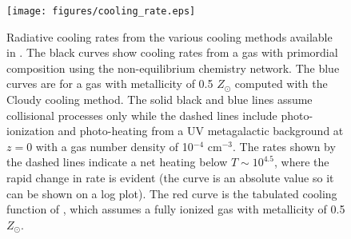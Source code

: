 \begin{figure}
  \begin{center}
    \texttt{[image: figures/cooling\_rate.eps]}
  \end{center}
  \caption{Radiative cooling rates from the various cooling methods
    available in \enzo.  The black curves show cooling rates from a gas
    with primordial composition using the non-equilibrium chemistry
    network.  The blue curves are for a gas with metallicity of 0.5
    $Z_{\odot}$ computed with the Cloudy cooling method.  The solid
    black and blue lines assume collisional processes only while the
    dashed lines include photo-ionization and photo-heating from a UV
    metagalactic background at $z = 0$ with a gas number density of
    10$^{-4}$ cm$^{-3}$.  The rates shown by the
    dashed lines indicate a net heating below $T \sim 10^{4.5}$, where
    the rapid change in rate is evident (the curve is an absolute
    value so it can be shown on a log plot).  The red curve is the
    tabulated cooling function of \citet{SW87}, which assumes a fully
    ionized gas with metallicity of 0.5 $Z_{\odot}$.}
  \label{fig.cooling_rate}
\end{figure}
